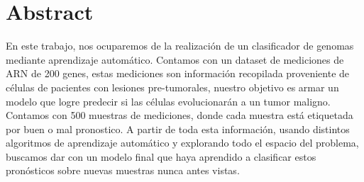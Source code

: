 \section*{Abstract}
En este trabajo, nos ocuparemos de la realización de un clasificador de genomas mediante aprendizaje automático.
Contamos con un dataset de mediciones de ARN de 200 genes, estas mediciones son información recopilada proveniente de células de pacientes con lesiones pre-tumorales, nuestro objetivo es armar un modelo que logre predecir si las células evolucionarán a un tumor maligno.
Contamos con 500 muestras de mediciones, donde cada muestra está etiquetada por buen o mal pronostico.
A partir de toda esta información, usando distintos algoritmos de aprendizaje automático y explorando todo el espacio del problema, buscamos dar con un modelo final que haya aprendido a clasificar estos pronósticos sobre nuevas muestras nunca antes vistas.